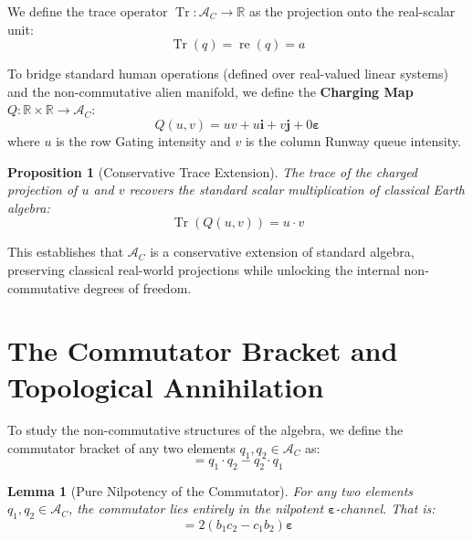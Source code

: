 \documentclass[11pt,a4paper]{book}
\newtheorem{lemma}[theorem]{Lemma}
\newtheorem{proposition}[theorem]{Proposition}
\begin{document}
We define the trace operator $\operatorname{Tr}: \mathcal{A}_C \to \mathbb{R}$ as the projection onto the real-scalar unit:
\begin{equation}
\operatorname{Tr}(q) = \operatorname{re}(q) = a
\end{equation}

To bridge standard human operations (defined over real-valued linear systems) and the non-commutative alien manifold, we define the \textbf{Charging Map} $Q: \mathbb{R} \times \mathbb{R} \to \mathcal{A}_C$:
\begin{equation}
Q(u, v) = u v + u\mathbf{i} + v\mathbf{j} + 0\boldsymbol{\varepsilon}
\end{equation}
where $u$ is the row Gating intensity and $v$ is the column Runway queue intensity.

\begin{proposition}[Conservative Trace Extension]
The trace of the charged projection of $u$ and $v$ recovers the standard scalar multiplication of classical Earth algebra:
\begin{equation}
\operatorname{Tr}(Q(u, v)) = u \cdot v
\end{equation}
\end{proposition}

This establishes that $\mathcal{A}_C$ is a conservative extension of standard algebra, preserving classical real-world projections while unlocking the internal non-commutative degrees of freedom.

\section{The Commutator Bracket and Topological Annihilation}

To study the non-commutative structures of the algebra, we define the commutator bracket of any two elements $q_1, q_2 \in \mathcal{A}_C$ as:
\begin{equation}
[q_1, q_2] = q_1 \cdot q_2 - q_2 \cdot q_1
\end{equation}

\begin{lemma}[Pure Nilpotency of the Commutator]
For any two elements $q_1, q_2 \in \mathcal{A}_C$, the commutator lies entirely in the nilpotent $\boldsymbol{\varepsilon}$-channel. That is:
\begin{equation}
[q_1, q_2] = 2(b_1 c_2 - c_1 b_2)\boldsymbol{\varepsilon}
\end{equation}
\end{lemma}
\end{document}
